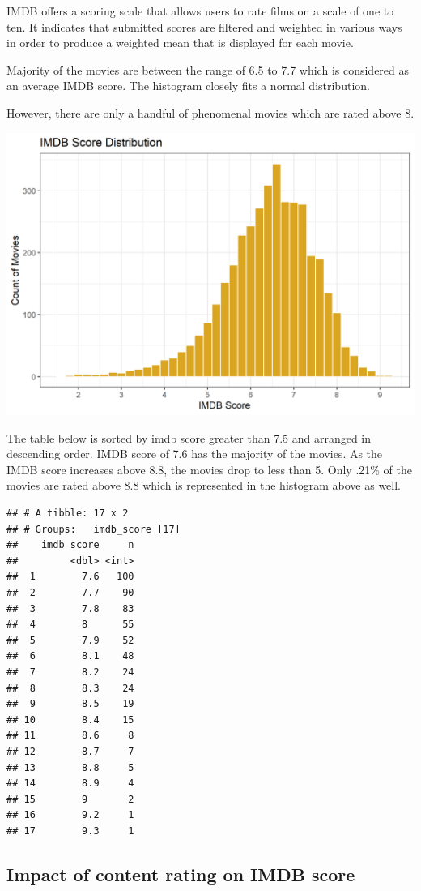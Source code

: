 \documentclass[
]{article}
\begin{document}
IMDB offers a scoring scale that allows users to rate films on a scale
of one to ten. It indicates that submitted scores are filtered and
weighted in various ways in order to produce a weighted mean that is
displayed for each movie.

Majority of the movies are between the range of 6.5 to 7.7 which is
considered as an average IMDB score. The histogram closely fits a normal
distribution.

However, there are only a handful of phenomenal movies which are rated
above 8.

\includegraphics[width=0.75\linewidth]{IMDB_files/figure-latex/score_distribution-1}

The table below is sorted by imdb score greater than 7.5 and arranged in
descending order. IMDB score of 7.6 has the majority of the movies. As
the IMDB score increases above 8.8, the movies drop to less than 5. Only
.21\% of the movies are rated above 8.8 which is represented in the
histogram above as well.

\begin{verbatim}
## # A tibble: 17 x 2
## # Groups:   imdb_score [17]
##    imdb_score     n
##         <dbl> <int>
##  1        7.6   100
##  2        7.7    90
##  3        7.8    83
##  4        8      55
##  5        7.9    52
##  6        8.1    48
##  7        8.2    24
##  8        8.3    24
##  9        8.5    19
## 10        8.4    15
## 11        8.6     8
## 12        8.7     7
## 13        8.8     5
## 14        8.9     4
## 15        9       2
## 16        9.2     1
## 17        9.3     1
\end{verbatim}

\hypertarget{impact-of-content-rating-on-imdb-score}{%
\subsection{Impact of content rating on IMDB
score}\label{impact-of-content-rating-on-imdb-score}}
\end{document}
